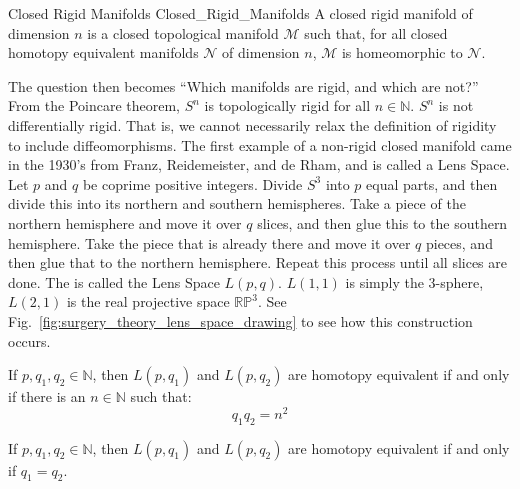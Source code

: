 \documentclass{book}                                                           %
\begin{document}
            \begin{ldefinition}{Closed Rigid Manifolds}
                               {Closed_Rigid_Manifolds}
                A closed rigid manifold of dimension $n$
                is a closed topological manifold $\mathcal{M}$
                such that, for all closed homotopy equivalent
                manifolds $\mathcal{N}$ of dimension $n$,
                $\mathcal{M}$ is homeomorphic to $\mathcal{N}$.
            \end{ldefinition}
            The question then becomes
            ``Which manifolds are rigid, and which are not?''
            From the Poincare theorem, $S^{n}$ is topologically
            rigid for all $n\in\mathbb{N}$. $S^{n}$ is not differentially
            rigid. That is, we cannot necessarily relax the definition
            of rigidity to include diffeomorphisms.
            The first example of a non-rigid closed
            manifold came in the 1930's from Franz, Reidemeister,
            and de Rham, and is called a Lens Space.
            Let $p$ and $q$ be coprime positive integers.
            Divide $S^{3}$ into $p$ equal parts, and then divide
            this into its northern and southern hemispheres.
            Take a piece of the northern hemisphere and move
            it over $q$ slices, and then glue this to the
            southern hemisphere. Take the piece that is already
            there and move it over $q$ pieces, and then glue
            that to the northern hemisphere. Repeat this
            process until all slices are done. The is called
            the Lens Space $L(p,q)$. $L(1,1)$ is simply the
            3-sphere, $L(2,1)$ is the real projective space
            $\mathbb{RP}^{3}$.
            See Fig.~\ref{fig:surgery_theory_lens_space_drawing}
            to see how this construction occurs.
            \begin{theorem}
                If $p,q_{1},q_{2}\in\mathbb{N}$, then $L(p,q_{1})$ and
                $L(p,q_{2})$ are homotopy equivalent if and only if there
                is an $n\in\mathbb{N}$ such that:
                \begin{equation}
                    q_{1}q_{2}=n^{2}
                \end{equation}
            \end{theorem}
            \begin{theorem}
                If $p,q_{1},q_{2}\in\mathbb{N}$, then $L(p,q_{1})$ and
                $L(p,q_{2})$ are homotopy equivalent if and only if
                $q_{1}=q_{2}$.
            \end{theorem}
\end{document}
